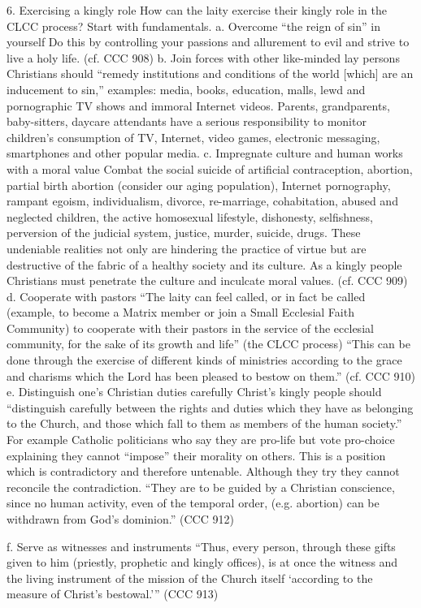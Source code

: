 \documentclass[oneside]{book}
\begin{document}
6. Exercising a kingly role
How can the laity exercise their kingly role in the CLCC process? Start with
fundamentals.
a. Overcome ``the reign of sin'' in yourself
Do this by controlling your passions and allurement to evil and strive to live a
holy life. (cf. CCC 908)
b. Join forces with other like-minded lay persons
Christians should ``remedy institutions and conditions of the world [which] are
an inducement to sin,'' examples: media, books, education, malls, lewd and
pornographic TV shows and immoral Internet videos. Parents, grandparents,
baby-sitters, daycare attendants have a serious responsibility to monitor
children's consumption of TV, Internet, video games, electronic messaging,
smartphones and other popular media.
c. Impregnate culture and human works with a moral value
Combat the social suicide of artificial contraception, abortion, partial birth
abortion (consider our aging population), Internet pornography, rampant egoism,
individualism, divorce, re-marriage, cohabitation, abused and neglected
children, the active homosexual lifestyle, dishonesty, selfishness, perversion
of the judicial system, justice, murder, suicide, drugs. These undeniable
realities not only are hindering the practice of virtue but are destructive of
the fabric of a healthy society and its culture. As a kingly people Christians
must penetrate the culture and inculcate moral values. (cf. CCC 909)
d. Cooperate with pastors
``The laity can feel called, or in fact be called (example, to become a Matrix
member or join a Small Ecclesial Faith Community) to cooperate with their
pastors in the service of the ecclesial community, for the sake of its growth
and life'' (the CLCC process) ``This can be done through the exercise of
different kinds of ministries according to the grace and charisms which the Lord
has been pleased to bestow on them.'' (cf. CCC 910)
e. Distinguish one's Christian duties carefully
Christ's kingly people should ``distinguish carefully between the rights and
duties which they have as belonging to the Church, and those which fall to them
as members of the human society.'' For example Catholic politicians who say they
are pro-life but vote pro-choice explaining they cannot ``impose'' their
morality on others. This is a position which is contradictory and therefore
untenable. Although they try they cannot reconcile the contradiction. ``They are
to be guided by a Christian conscience, since no human activity, even of the
temporal order, (e.g. abortion) can be withdrawn from God's dominion.'' (CCC
912)

f. Serve as witnesses and instruments
``Thus, every person, through these gifts given to him (priestly, prophetic and
kingly offices), is at once the witness and the living instrument of the mission
of the Church itself `according to the measure of Christ's bestowal.''' (CCC 913)
\end{document}
